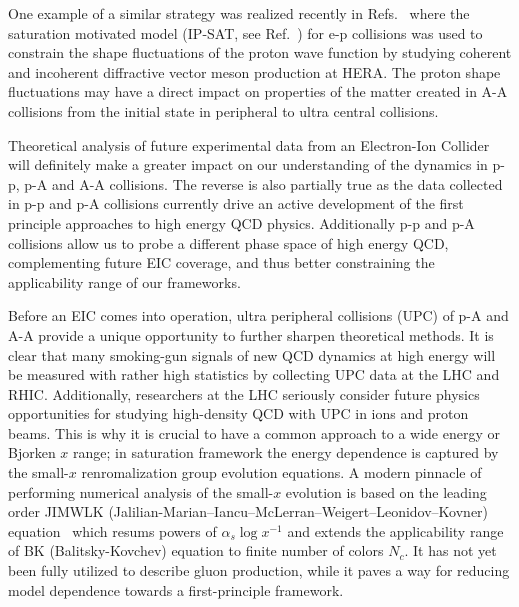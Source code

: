 One example of a similar strategy was realized recently in Refs.~\cite{Mantysaari:2016ykx,Mantysaari:2016jaz,Mantysaari:2017cni} 
where the saturation motivated model (IP-SAT, see Ref.~\cite{Kowalski:2003hm}) for e-p collisions  was used to constrain the 
shape fluctuations of the proton wave function by studying 
coherent and incoherent diffractive 
vector meson production at HERA. The proton shape fluctuations may have a direct 
impact on properties of the matter created in A-A collisions from 
the initial state in peripheral to ultra central collisions. 



Theoretical analysis of future experimental data from an Electron-Ion Collider  will 
definitely make a greater impact on our understanding of the dynamics in 
p-p, p-A and A-A collisions.  %
The reverse is also partially true as the data collected 
in p-p and p-A collisions currently drive an active 
development of the first principle approaches to 
high energy QCD physics. Additionally p-p and p-A 
collisions allow us to probe a different phase space 
of high energy  QCD, complementing future EIC coverage, and thus 
better constraining the applicability range of our frameworks. 

Before an EIC comes into operation, ultra peripheral collisions (UPC) 
of p-A and A-A provide a unique opportunity to 
further sharpen theoretical methods. It is clear that 
many smoking-gun signals of new QCD dynamics at high energy 
will be measured with rather high statistics 
by collecting UPC data at the LHC and RHIC. Additionally, researchers at the LHC 
seriously consider 
future physics opportunities for studying high-density QCD 
with UPC in ions and proton beams. This is why it is 
crucial to have a common approach to a wide energy or Bjorken $x$ range; 
in saturation framework the energy dependence  is captured by the small-$x$ 
renromalization group evolution equations.  
A modern pinnacle of performing numerical analysis of the small-$x$ evolution is based on 
the leading order  JIMWLK (Jalilian-Marian--Iancu--McLerran--Weigert--Leonidov--Kovner) equation~\cite{JalilianMarian:1997dw, 
JalilianMarian:1997gr,
Iancu:2001ad, 
Iancu:2000hn}  which resums powers of $\alpha_s \log x^{-1}$
and extends the applicability range of BK (Balitsky-Kovchev) equation \cite{Balitsky:1995ub,Balitsky:1998ya,Kovchegov:1999yj,Kovchegov:1999ua} to finite number of colors $N_c$. 
It has not yet been fully utilized to describe gluon production, 
while it paves a way for reducing model dependence towards  
a first-principle framework.  

